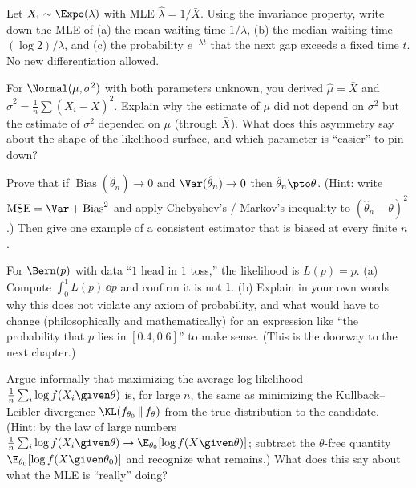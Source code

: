 \begin{exercise}[Invariance]
\label{ch30:exc-invariance}
Let $X_i\sim\Expo(\lambda)$ with MLE $\hat\lambda=1/\bar X$. Using the invariance
property, write down the MLE of (a) the mean waiting time $1/\lambda$, (b) the
median waiting time $(\log 2)/\lambda$, and (c) the probability $e^{-\lambda t}$
that the next gap exceeds a fixed time $t$. No new differentiation allowed.
\end{exercise}

\begin{exercise}
\label{ch30:exc-two-param}
For $\Normal(\mu,\sigma^2)$ with both parameters unknown, you derived
$\hat\mu=\bar X$ and $\hat\sigma^2=\frac1n\sum(X_i-\bar X)^2$. Explain why the
estimate of $\mu$ did not depend on $\sigma^2$ but the estimate of $\sigma^2$
depended on $\mu$ (through $\bar X$). What does this asymmetry say about the
shape of the likelihood surface, and which parameter is ``easier'' to pin down?
\end{exercise}

\begin{exercise}
\label{ch30:exc-consistency}
Prove that if $\operatorname{Bias}(\hat\theta_n)\to 0$ and
$\Var(\hat\theta_n)\to 0$ then $\hat\theta_n \pto \theta$. (Hint: write
$\mathrm{MSE}=\Var+\operatorname{Bias}^2$ and apply Chebyshev's / Markov's
inequality to $(\hat\theta_n-\theta)^2$.) Then give one example of a consistent
estimator that is biased at every finite $n$.
\end{exercise}

\begin{exercise}
\label{ch30:exc-not-prob}
For $\Bern(p)$ with data ``$1$ head in $1$ toss,'' the likelihood is $L(p)=p$.
(a) Compute $\int_0^1 L(p)\,\dd p$ and confirm it is not $1$.
(b) Explain in your own words why this does not violate any axiom of probability,
and what would have to change (philosophically and mathematically) for an
expression like ``the probability that $p$ lies in $[0.4,0.6]$'' to make sense.
(This is the doorway to the next chapter.)
\end{exercise}

\begin{exercise}
\label{ch30:exc-kl}
Argue informally that maximizing the average log-likelihood
$\frac1n\sum_i \log f(X_i\given\theta)$ is, for large $n$, the same as minimizing
the Kullback--Leibler divergence $\KL(f_{\theta_0}\,\|\,f_\theta)$ from the true
distribution to the candidate. (Hint: by the law of large numbers
$\frac1n\sum_i\log f(X_i\given\theta)\to \E_{\theta_0}[\log f(X\given\theta)]$;
subtract the $\theta$-free quantity $\E_{\theta_0}[\log f(X\given\theta_0)]$ and
recognize what remains.) What does this say about what the MLE is ``really''
doing?
\end{exercise}
